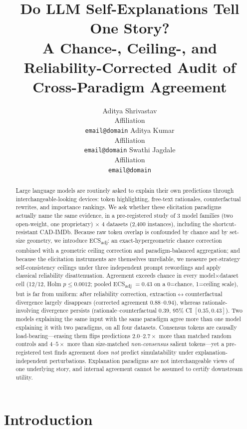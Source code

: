 \documentclass[11pt]{article}
\title{Do LLM Self-Explanations Tell One Story?\\A Chance-, Ceiling-, and Reliability-Corrected Audit of Cross-Paradigm Agreement}
\author{Aditya Shrivastav \\
  Affiliation \\
  \texttt{email@domain} \And
  Aditya Kumar \\
  Affiliation \\
  \texttt{email@domain} \And
  Swathi Jagdale \\
  Affiliation \\
  \texttt{email@domain}}
\newcommand{\ecsadj}{\mbox{ECS\textsubscript{adj}}}
\begin{document}
\maketitle

\begin{abstract}
Large language models are routinely asked to explain their own predictions through interchangeable-looking devices: token highlighting, free-text rationales, counterfactual rewrites, and importance rankings. We ask whether these elicitation paradigms actually name the same evidence, in a pre-registered study of 3 model families (two open-weight, one proprietary) $\times$ 4 datasets (2{,}400 instances), including the shortcut-resistant CAD-IMDb. Because raw token overlap is confounded by chance and by set-size geometry, we introduce \ecsadj{}: an exact-hypergeometric chance correction combined with a geometric ceiling correction and paradigm-balanced aggregation; and because the elicitation instruments are themselves unreliable, we measure per-strategy self-consistency ceilings under three independent prompt rewordings and apply classical reliability disattenuation. Agreement exceeds chance in every model$\times$dataset cell (12/12, Holm $p{\le}0.0012$; pooled \ecsadj{} $=0.43$ on a 0=chance, 1=ceiling scale), but is far from uniform: after reliability correction, extraction$\leftrightarrow$counterfactual divergence largely disappears (corrected agreement $0.88$--$0.94$), whereas rationale-involving divergence persists (rationale--counterfactual $0.39$, 95\% CI $[0.35,0.43]$). Two models explaining the same input with the same paradigm agree more than one model explaining it with two paradigms, on all four datasets. Consensus tokens are causally load-bearing---erasing them flips predictions $2.0$--$2.7\times$ more than matched random controls and $4$--$5\times$ more than size-matched \emph{non-consensus} salient tokens---yet a pre-registered test finds agreement does \emph{not} predict simulatability under explanation-independent perturbations. Explanation paradigms are not interchangeable views of one underlying story, and internal agreement cannot be assumed to certify downstream utility.
\end{abstract}

\section{Introduction}
\label{sec:intro}
\end{document}
